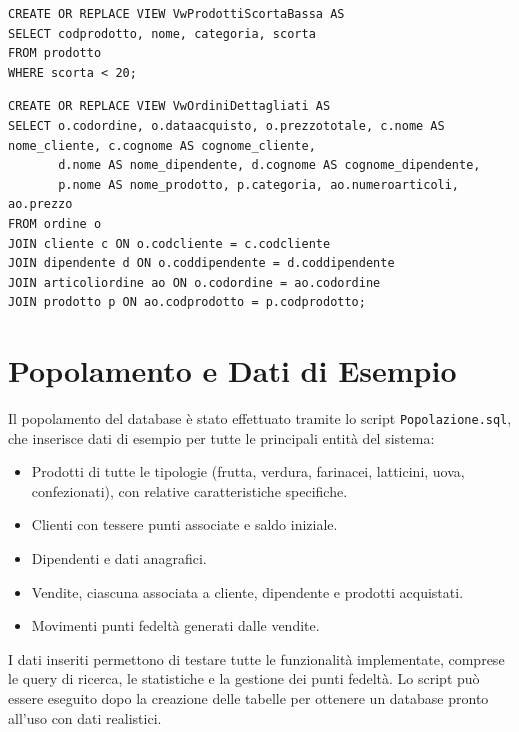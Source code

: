 \documentclass[a4paper,12pt]{article}
\begin{document}
\begin{lstlisting}[style=sqlstyle]
CREATE OR REPLACE VIEW VwProdottiScortaBassa AS
SELECT codprodotto, nome, categoria, scorta
FROM prodotto
WHERE scorta < 20;
\end{lstlisting}

\begin{lstlisting}[style=sqlstyle]
CREATE OR REPLACE VIEW VwOrdiniDettagliati AS
SELECT o.codordine, o.dataacquisto, o.prezzototale, c.nome AS nome_cliente, c.cognome AS cognome_cliente,
       d.nome AS nome_dipendente, d.cognome AS cognome_dipendente,
       p.nome AS nome_prodotto, p.categoria, ao.numeroarticoli, ao.prezzo
FROM ordine o
JOIN cliente c ON o.codcliente = c.codcliente
JOIN dipendente d ON o.coddipendente = d.coddipendente
JOIN articoliordine ao ON o.codordine = ao.codordine
JOIN prodotto p ON ao.codprodotto = p.codprodotto;
\end{lstlisting}

\newpage
\section{Popolamento e Dati di Esempio}

Il popolamento del database è stato effettuato tramite lo script \texttt{Popolazione.sql}, che inserisce dati di esempio per tutte le principali entità del sistema:
\begin{itemize}
    \item Prodotti di tutte le tipologie (frutta, verdura, farinacei, latticini, uova, confezionati), con relative caratteristiche specifiche.
    \item Clienti con tessere punti associate e saldo iniziale.
    \item Dipendenti e dati anagrafici.
    \item Vendite, ciascuna associata a cliente, dipendente e prodotti acquistati.
    \item Movimenti punti fedeltà generati dalle vendite.
\end{itemize}

I dati inseriti permettono di testare tutte le funzionalità implementate, comprese le query di ricerca, le statistiche e la gestione dei punti fedeltà. Lo script può essere eseguito dopo la creazione delle tabelle per ottenere un database pronto all'uso con dati realistici.
\end{document}
